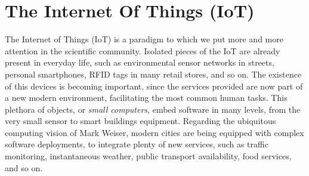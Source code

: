 \chapter{The Internet Of Things (IoT)}
\label{ch:IoT}

The Internet of Things (IoT) is a paradigm to which we put more and more attention in the scientific community\cite{atzori2010iotsurvey}.
Isolated pieces of the IoT are already present in everyday life, such as environmental sensor networks in streets, personal smartphones, RFID tags in many retail stores, and so on.
The existence of this devices is becoming important, since the services provided are now part of a new modern environment, facilitating the most common human tasks.
This plethora of objects, or \textit{small computers}, embed software in many levels, from the very small sensor to smart buildings equipment.
Regarding the ubiquitous computing vision of Mark Weiser\cite{weiser1999ubiquitous}, modern cities are being equipped with complex software deployments, to integrate plenty of new services, such as traffic monitoring, instantaneous weather, public transport availability, food services, and so on.





